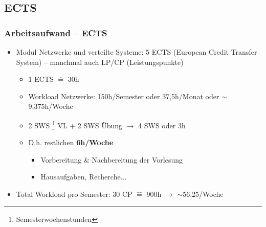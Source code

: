 \documentclass[xcolor=dvipsnames,aspectratio=169]{beamer}
\begin{document}
\subsection{ECTS}
\begin{frame}
	\frametitle{Arbeitsaufwand -- ECTS}
	\begin{itemize}
		\item Modul Netzwerke und verteilte Systeme: 5 ECTS (European Credit Transfer System) -- manchmal auch LP/CP (Leistungspunkte)
			\begin{itemize}
				\item 1 ECTS $\widehat{=}$ 30h
				\item Workload Netzwerke: 150h/Semester oder 37,5h/Monat oder $\sim$ 9,375h/Woche
				\item 2 SWS \footnote{Semesterwochenstunden} VL + 2 SWS Übung $\rightarrow$ 4 SWS oder 3h
				\item D.h. restlichen \textbf{6h/Woche}
				\begin{itemize}
					\item Vorbereitung \& Nachbereitung der Vorlesung
					\item Hausaufgaben, Recherche...
				\end{itemize}
			\end{itemize}
			\item Total Workload pro Semester: 30 CP $\widehat{=}$ 900h $\rightarrow$  $\sim$56.25/Woche
	\end{itemize}
\end{frame}
\end{document}
